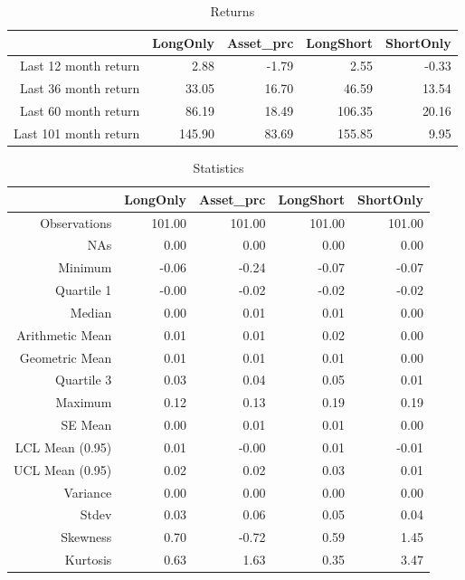 \documentclass{article}
\begin{document}
\begin{table}[ht]
\centering
\caption{Returns} 
\begin{tabular}{rrrrr}
  \hline
 & LongOnly & Asset\_prc & LongShort & ShortOnly \\ 
  \hline
Last 12 month return & 2.88 & -1.79 & 2.55 & -0.33 \\ 
  Last 36 month return & 33.05 & 16.70 & 46.59 & 13.54 \\ 
  Last 60 month return & 86.19 & 18.49 & 106.35 & 20.16 \\ 
  Last 101 month return & 145.90 & 83.69 & 155.85 & 9.95 \\ 
   \hline
\end{tabular}
\end{table}%
\begin{table}[ht]
\centering
\caption{Statistics} 
\begin{tabular}{rrrrr}
  \hline
 & LongOnly & Asset\_prc & LongShort & ShortOnly \\ 
  \hline
Observations & 101.00 & 101.00 & 101.00 & 101.00 \\ 
  NAs & 0.00 & 0.00 & 0.00 & 0.00 \\ 
  Minimum & -0.06 & -0.24 & -0.07 & -0.07 \\ 
  Quartile 1 & -0.00 & -0.02 & -0.02 & -0.02 \\ 
  Median & 0.00 & 0.01 & 0.01 & 0.00 \\ 
  Arithmetic Mean & 0.01 & 0.01 & 0.02 & 0.00 \\ 
  Geometric Mean & 0.01 & 0.01 & 0.01 & 0.00 \\ 
  Quartile 3 & 0.03 & 0.04 & 0.05 & 0.01 \\ 
  Maximum & 0.12 & 0.13 & 0.19 & 0.19 \\ 
  SE Mean & 0.00 & 0.01 & 0.01 & 0.00 \\ 
  LCL Mean (0.95) & 0.01 & -0.00 & 0.01 & -0.01 \\ 
  UCL Mean (0.95) & 0.02 & 0.02 & 0.03 & 0.01 \\ 
  Variance & 0.00 & 0.00 & 0.00 & 0.00 \\ 
  Stdev & 0.03 & 0.06 & 0.05 & 0.04 \\ 
  Skewness & 0.70 & -0.72 & 0.59 & 1.45 \\ 
  Kurtosis & 0.63 & 1.63 & 0.35 & 3.47 \\ 
   \hline
\end{tabular}
\end{table}
\end{document}

